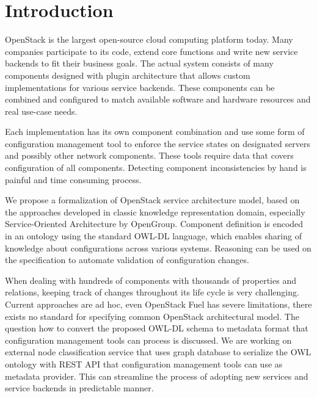 
\section{Introduction}



OpenStack is the largest open-source cloud computing platform today. Many companies participate to its code, extend core functions and write new service backends to fit their business goals. The actual system consists of many components designed with plugin architecture that allows custom implementations for various service backends. These components can be combined and configured to match available software and hardware resources and real use-case needs.

Each implementation has its own component combination and use some form of configuration management tool to enforce the service states on designated servers and possibly other network components. These tools require data that covers configuration of all components. Detecting component inconsistencies by hand is painful and time consuming process.

We propose a formalization of OpenStack service architecture model, based on the approaches developed in classic knowledge representation domain, especially Service-Oriented Architecture by OpenGroup. Component definition is encoded in an ontology using the standard OWL-DL language, which enables sharing of knowledge about configurations across various systems. Reasoning can be used on the specification to automate validation of configuration changes.

When dealing with hundreds of components with thousands of properties and relations, keeping track of changes throughout its life cycle is very challenging. Current approaches are ad hoc, even OpenStack Fuel has severe limitations, there exists no standard for specifying common OpenStack architectural model. The question how to convert the proposed OWL-DL schema to metadata format that configuration management tools can process is discussed. We are working on external node classification service that uses graph database to serialize the OWL ontology with REST API that configuration management tools can use as metadata provider. This can streamline the process of adopting new services and service backends in predictable manner.

